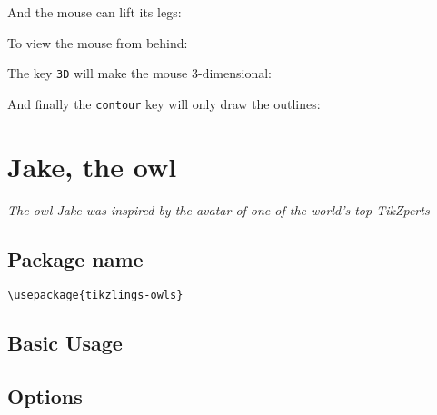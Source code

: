 \documentclass[parskip=half]{scrartcl}
\begin{document}
And the mouse can lift its legs:
\begin{tcblisting}{}
\mouse[leftstep]
\mouse[rightstep,xshift=2cm]
\end{tcblisting}

To view the mouse from behind:
\begin{tcblisting}{}
\mouse[back]
\end{tcblisting}

The key \lstinline|3D| will make the mouse 3-dimensional:
\begin{tcblisting}{}
\mouse[3D]
\end{tcblisting}

And finally the \lstinline|contour| key will only draw the outlines:
\begin{tcblisting}{}
\mouse[contour=black]
\end{tcblisting}

%
%
\clearpage
\section[Owl]{Jake, the owl}

\emph{The owl Jake was inspired by the avatar of one of the world's top TikZperts}

\subsection{Package name}

\begin{tcolorbox}[lower separated=false, lefthand width=.8\linewidth]
\vspace*{0.5cm}
\lstinline|\usepackage{tikzlings-owls}| 
\vspace*{0.5cm}
\end{tcolorbox}

\subsection{Basic Usage}

\begin{tcblisting}{}
\owl
\end{tcblisting}

\subsection{Options}
\end{document}
